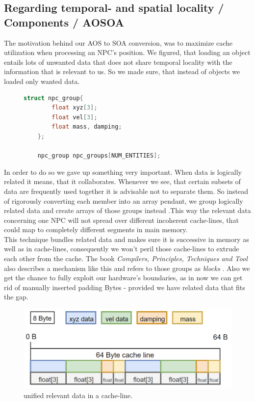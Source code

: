 \subsection{Regarding temporal- and spatial locality / Components / AOSOA}\label{rtasl}
The motivation behind our AOS to SOA conversion, was to maximize cache utilization when processing an NPC's position. We figured, that loading an object entails lots of unwanted data that does not share temporal locality with the information that is relevant to us. So we made sure, that instead of objects we loaded only wanted data.
\begin{figure}
	\begin{lstlisting}[language=C++,numbers=none,name={Consolidating related data},label={component_npc}]
	struct npc_group{
		float xyz[3];
		float vel[3];
		float mass, damping;
	};
	
	npc_group npc_groups[NUM_ENTITIES];
	\end{lstlisting}
\end{figure}
In order to do so we gave up something very important. When data is logically related it means, that it collaborates. Whenever we see, that certain subsets of data are frequently used together it is advisable not to separate them. So instead of rigorously converting each member into an array pendant, we group logically related data and create arrays of those groups instead .This way the relevant data concerning one NPC will not spread over different incoherent cache-lines, that could map to completely different segments in main memory.\\
This technique bundles related data and makes sure it is successive in memory as well as in cache-lines, consequently we won't peril those cache-lines to extrude each other from the cache. The book \textit{Compilers, Principles, Techniques and Tool} also describes a mechanism like this and refers to those groups as \textit{blocks} .
Also we get the chance to fully exploit our hardware's boundaries, as in now we can get rid of manually inserted padding Bytes  - provided we have related data that fits the gap.
\begin{figure}[!htbp]
	\centering
	\includegraphics[width=.6\linewidth, height=0.16\linewidth]{PICs/CacheUtilizationNPCComp}
	\caption{unified relevant data in a cache-line.}\label{cache_utilization_comp}
\end{figure}
